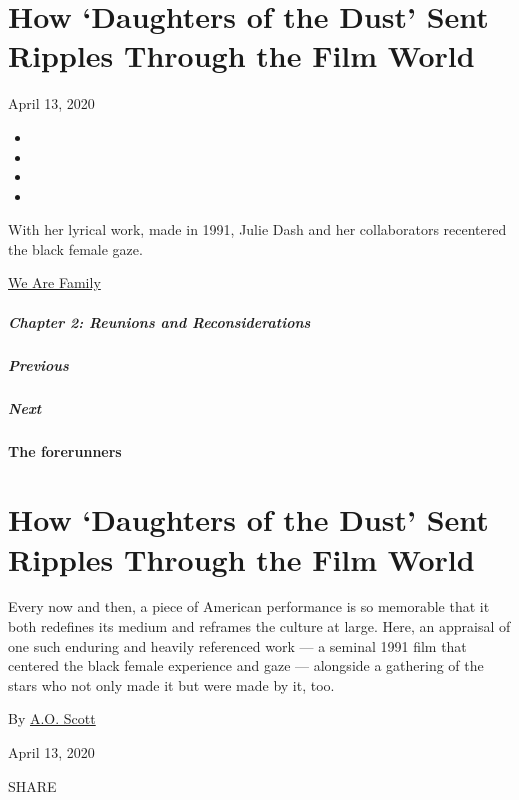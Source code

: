 \hypertarget{how-daughters-of-the-dust-sent-ripples-through-the-film-world}{%
\section{How `Daughters of the Dust' Sent Ripples Through the Film
World}\label{how-daughters-of-the-dust-sent-ripples-through-the-film-world}}

April 13, 2020

\begin{itemize}
\item
\item
\item
\item
\end{itemize}

With her lyrical work, made in 1991, Julie Dash and her collaborators
recentered the black female gaze.

\href{https://www.nytimes.com/interactive/2020/04/13/t-magazine/culture-issue-2020.html}{We
Are Family}

\hypertarget{chapter-2-reunions-and-reconsiderations}{%
\subparagraph{Chapter 2: Reunions and
Reconsiderations}\label{chapter-2-reunions-and-reconsiderations}}

\hypertarget{previous}{%
\subparagraph{Previous}\label{previous}}

\hypertarget{next}{%
\subparagraph{Next}\label{next}}

\textbf{The forerunners}

\hypertarget{how-daughters-of-the-dust-sent-ripples-through-the-film-world-1}{%
\section{How `Daughters of the Dust' Sent Ripples Through the Film
World}\label{how-daughters-of-the-dust-sent-ripples-through-the-film-world-1}}

Every now and then, a piece of American performance is so memorable that
it both redefines its medium and reframes the culture at large. Here, an
appraisal of one such enduring and heavily referenced work --- a seminal
1991 film that centered the black female experience and gaze ---
alongside a gathering of the stars who not only made it but were made by
it, too.

By \href{https://www.nytimes.com/by/a-o--scott}{A.O. Scott}

April 13, 2020

SHARE

